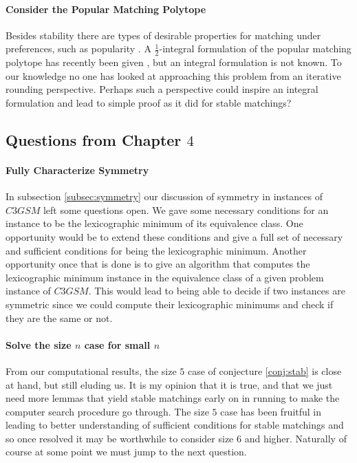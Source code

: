 \paragraph{Consider the Popular Matching Polytope}
Besides stability there are types of desirable properties for matching under preferences, such as popularity \cite{abraham2007popular}. A $\frac{1}{2}$-integral formulation of the popular matching polytope has recently been given \cite{kavitha2016popular}, but an integral formulation is not known. To our knowledge no one has looked at approaching this problem from an iterative rounding perspective. Perhaps such a perspective could inspire an integral formulation and lead to simple proof as it did for stable matchings?

\subsection{Questions from Chapter $4$}

\paragraph{Fully Characterize Symmetry}
In subsection \ref{subsec:symmetry} our discussion of symmetry in instances of $C3GSM$ left some questions open. We gave some necessary conditions for an instance to be the lexicographic minimum of its equivalence class. One opportunity would be to extend these conditions and give a full set of necessary and sufficient conditions for being the lexicographic minimum. Another opportunity once that is done is to give an algorithm that computes the lexicographic minimum instance in the equivalence class of a given problem instance of $C3GSM$. This would lead to being able to decide if two instances are symmetric since we could compute their lexicographic minimums and check if they are the same or not.

\paragraph{Solve the size $n$ case for small $n$}
From our computational results, the size $5$ case of conjecture \ref{conj:stab} is close at hand, but still eluding us. It is my opinion that it is true, and that we just need more lemmas that yield stable matchings early on in running to make the computer search procedure go through. The size $5$ case has been fruitful in leading to better understanding of sufficient conditions for stable matchings and so once resolved it may be worthwhile to consider size $6$ and higher. Naturally of course at some point we must jump to the next question.

